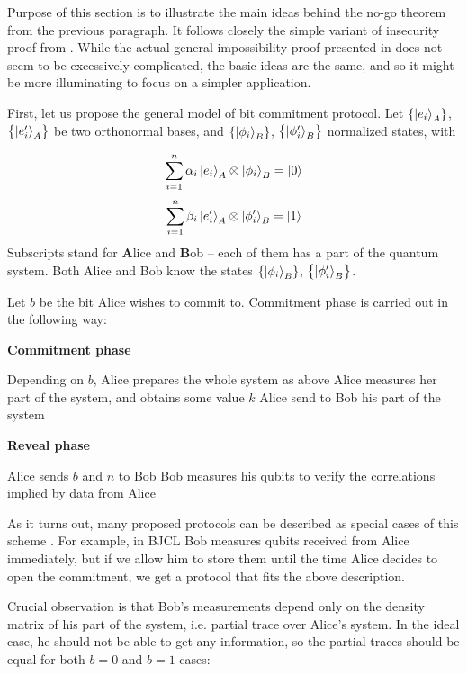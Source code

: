 \documentclass[10pt]{article}
\begin{document}
Purpose of this section is to illustrate the main ideas behind the no-go theorem from the previous
paragraph. It follows closely the simple variant of insecurity proof from \cite{Lo96}. While the actual
general impossibility proof presented in \cite{Mayers97} does not seem to be excessively complicated,
the basic ideas are the same, and so it might be more illuminating to focus on a simpler application.

First, let us propose the general model of bit commitment protocol. Let \(\left\{\Ket{e_i}_A\right\}\),
\(\left\{\Ket{e'_i}_A\right\}\) be two orthonormal bases, and \(\left\{\Ket{\phi_i}_B\right\}\),
\(\left\{\Ket{\phi'_i}_B\right\}\) normalized states, with

\[
\sum_{i=1}^n\alpha_i \Ket{e_i}_A\otimes \Ket{\phi_i}_B=\Ket{0}
\]
\[
\sum_{i=1}^n\beta_i \Ket{e'_i}_A\otimes \Ket{\phi'_i}_B=\Ket{1}
\]
Subscripts stand for \textbf{A}lice and \textbf{B}ob -- each of them has a part of the quantum system. 
Both Alice and Bob know the states \(\left\{\Ket{\phi_i}_B\right\}\), \(\left\{\Ket{\phi'_i}_B\right\}\).

Let \(b\) be the bit Alice wishes to commit to. Commitment phase is carried out in the following
way:

\NoCaptionOfAlgo
\begin{algorithm}[H]
\caption{\textbf{Commitment phase}}
Depending on \(b\), Alice prepares the whole system as above \;
Alice measures her part of the system, and obtains some value \(k\) \;
Alice send to Bob his part of the system \;
\end{algorithm}

\NoCaptionOfAlgo
\begin{algorithm}[H]
\caption{\textbf{Reveal phase}}
Alice sends \(b\) and \(n\) to Bob \;
Bob measures his qubits to verify the correlations implied by data from Alice \;
\end{algorithm}

As it turns out, many proposed protocols can be described as special cases of this scheme 
\cite{Lo96}. For example, in BJCL Bob measures qubits received from Alice immediately, but if we
allow him to store them until the time Alice decides to open the commitment, we get a protocol
that fits the above description.

Crucial observation is that Bob's measurements depend only on the density matrix of his part
of the system, i.e. partial trace over Alice's system. In the ideal case, he should not be able to
get any information, so the partial traces should be equal for both \(b=0\) and \(b=1\) cases:
\end{document}
